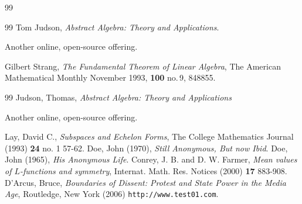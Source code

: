\documentclass[pdflatex]{sn-jnl}
\theoremstyle{thmstyleone}%
\theoremstyle{thmstyletwo}%
\theoremstyle{thmstylethree}%
\newcommand{\mono}[1]{\texttt{#1}}
\numberwithin{equation}{section}
\begin{document}
\begin{appendices}
\begin{thebibliography}{99}
\end{thebibliography}
%
%
\typeout{************************************************}
\typeout{************************************************}
%

\begin{thebibliography}{99}
\hypertarget{biblio-judson-AATA}{}Tom Judson, \textit{Abstract Algebra: Theory and Applications}. \par\hypertarget{note-judson-AATA}{}%
Another online, open-source offering.%

\hypertarget{biblio-strang-article-tres}{}Gilbert Strang, \textit{The Fundamental Theorem of Linear Algebra}, The American Mathematical Monthly November 1993, \textbf{100} no.\@\,9, 848\textendash{}855.
\end{thebibliography}
\end{appendices}%
%
%
\typeout{************************************************}
\typeout{************************************************}
%

\begin{thebibliography}{99}
\hypertarget{biblio-judson-aata}{}Judson, Thomas, \textit{Abstract Algebra: Theory and Applications}\par%
Another online, open-source offering.%

\hypertarget{biblio-lay-article}{}Lay, David C., \textit{Subspaces and Echelon Forms}, The College Mathematics Journal (1993) \textbf{24} no. 1 57-62.
\hypertarget{citeproc-py-item-3-later}{}Doe, John (1970), \textit{Still Anonymous, But now Ibid}.
\hypertarget{citeproc-py-item-3}{}Doe, John (1965), \textit{His Anonymous Life}.
\hypertarget{conrey-farmer}{}Conrey, J. B. and D. W. Farmer, \textit{Mean values of \(L\)-functions and symmetry}, Internat. Math. Res. Notices (2000) \textbf{17} 883-908.
\hypertarget{citeproc-py-item-5}{}D'Arcus, Bruce, \textit{Boundaries of Dissent: Protest and State Power in the Media Age}, Routledge, New York (2006) \mono{http:\slash{}\slash{}www.test01.com}.
\end{thebibliography}
%
\end{document}
